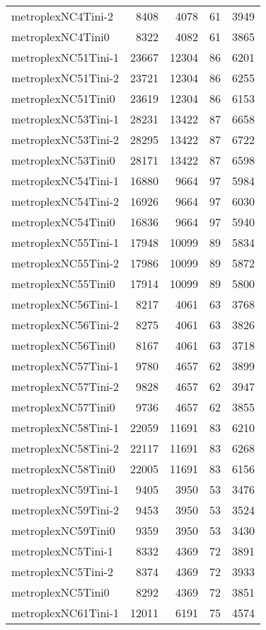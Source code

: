 \documentclass[../../../thesis.tex]{subfiles}
\begin{document}
\begin{longtable}{lrrrr}
metroplexNC4Tini-2 & 8408 & 4078 & 61 & 3949 \\
metroplexNC4Tini0 & 8322 & 4082 & 61 & 3865 \\
metroplexNC51Tini-1 & 23667 & 12304 & 86 & 6201 \\
metroplexNC51Tini-2 & 23721 & 12304 & 86 & 6255 \\
metroplexNC51Tini0 & 23619 & 12304 & 86 & 6153 \\
metroplexNC53Tini-1 & 28231 & 13422 & 87 & 6658 \\
metroplexNC53Tini-2 & 28295 & 13422 & 87 & 6722 \\
metroplexNC53Tini0 & 28171 & 13422 & 87 & 6598 \\
metroplexNC54Tini-1 & 16880 & 9664 & 97 & 5984 \\
metroplexNC54Tini-2 & 16926 & 9664 & 97 & 6030 \\
metroplexNC54Tini0 & 16836 & 9664 & 97 & 5940 \\
metroplexNC55Tini-1 & 17948 & 10099 & 89 & 5834 \\
metroplexNC55Tini-2 & 17986 & 10099 & 89 & 5872 \\
metroplexNC55Tini0 & 17914 & 10099 & 89 & 5800 \\
metroplexNC56Tini-1 & 8217 & 4061 & 63 & 3768 \\
metroplexNC56Tini-2 & 8275 & 4061 & 63 & 3826 \\
metroplexNC56Tini0 & 8167 & 4061 & 63 & 3718 \\
metroplexNC57Tini-1 & 9780 & 4657 & 62 & 3899 \\
metroplexNC57Tini-2 & 9828 & 4657 & 62 & 3947 \\
metroplexNC57Tini0 & 9736 & 4657 & 62 & 3855 \\
metroplexNC58Tini-1 & 22059 & 11691 & 83 & 6210 \\
metroplexNC58Tini-2 & 22117 & 11691 & 83 & 6268 \\
metroplexNC58Tini0 & 22005 & 11691 & 83 & 6156 \\
metroplexNC59Tini-1 & 9405 & 3950 & 53 & 3476 \\
metroplexNC59Tini-2 & 9453 & 3950 & 53 & 3524 \\
metroplexNC59Tini0 & 9359 & 3950 & 53 & 3430 \\
metroplexNC5Tini-1 & 8332 & 4369 & 72 & 3891 \\
metroplexNC5Tini-2 & 8374 & 4369 & 72 & 3933 \\
metroplexNC5Tini0 & 8292 & 4369 & 72 & 3851 \\
metroplexNC61Tini-1 & 12011 & 6191 & 75 & 4574 \\

\end{longtable}
\end{document}
